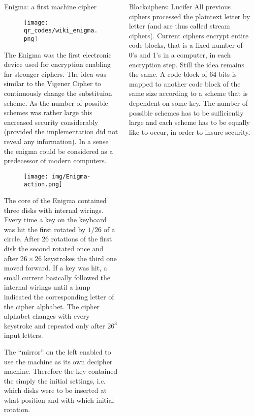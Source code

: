 \documentclass[final,hyperref={pdfpagelabels=false}]{beamer}
\begin{document}
\begin{frame}{}
\begin{columns}[t]
\begin{column}{.32\linewidth}
        \begin{block}{Enigma: a first machine cipher}
        \begin{wrapfigure}{l}{0.1\textwidth}
          \vspace{-20pt}
            \texttt{[image: qr\_codes/wiki\_enigma.png]}
          \vspace{-20pt}
        \end{wrapfigure}
          The Enigma was the first electronic device used for encryption enabling far stronger ciphers. The idea was similar to the Vigener Cipher to continuously change the substituion scheme. As the number of possible schemes was rather large this encreased security considerably (provided the implementation did not reveal any information). In a sense the enigma could be considered as a predecessor of modern computers.
          \begin{figure}
          \center
            \texttt{[image: img/Enigma-action.png]}
          \end{figure}
          The core of the Enigma contained three disks with internal wirings. Every time a key on the keyboard was hit the first rotated by $1/26$ of a circle. After 26 rotations of the first disk the second rotated once and after $26\times 26$ keystrokes the third one moved forward. If a key was hit, a small current basically followed the internal wirings until a lamp indicated the corresponding letter of the cipher alphabet. The cipher alphabet changes with every keystroke and repeated only after $26^3$ input letters. \par The ``mirror'' on the left enabled to use the machine as its own decipher machine. Therefore the key contained the simply the initial settings, i.e. which disks were to be inserted at what position and with which initial rotation. 
        \end{block}
      \end{column}
      \begin{column}{.32\linewidth}

        \begin{block}{Blockciphers: Lucifer}
          All previous ciphers processed the plaintext letter by letter (and are thus called \alert{stream ciphers}). Current ciphers encrypt entire code blocks, that is a fixed number of 0's and 1's in a computer, in each encryption step. Still the idea remains the same. A code block of 64 bits is mapped to another code block of the same size according to a scheme that is dependent on some key. The number of possible schemes has to be sufficiently large and each scheme has to be equally like to occur, in order to insure security.
        \end{block}


\end{column}
\end{columns}
\end{frame}
\end{document}
